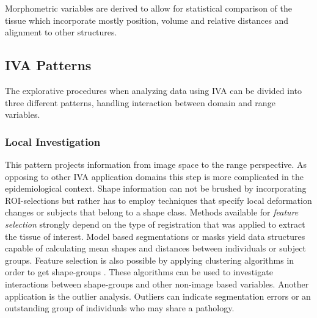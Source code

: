 \documentclass[journal]{style/vgtc}           %
\begin{document}
Morphometric variables are derived to allow for statistical comparison of the tissue which incorporate mostly position, volume and relative distances and alignment to other structures.
% 

\subsection{IVA Patterns}

The explorative procedures when analyzing data using IVA can be divided into three different patterns, handling interaction between domain and range variables.

\subsubsection{Local Investigation}
This pattern projects information from image space to the range perspective.
%
As opposing to other IVA application domains this step is more complicated in the epidemiological context.
%
Shape information can not be brushed by incorporating ROI-selections but rather has to employ techniques that specify local deformation changes \cite{Hermann2014} or subjects that belong to a shape class.
%
Methods available for \emph{feature selection} strongly depend on the type of registration that was applied to extract the tissue of interest.
%
Model based segmentations or masks yield data structures capable of calculating mean shapes and distances between individuals or subject groups.
%
Feature selection is also possible by applying clustering algorithms in order to get shape-groups \cite{Klemm2013}.
%
These algorithms can be used to investigate interactions between shape-groups and other non-image based variables.
%
Another application is the outlier analysis.
%
Outliers can indicate segmentation errors or an outstanding group of individuals who may share a pathology.

\end{document}
